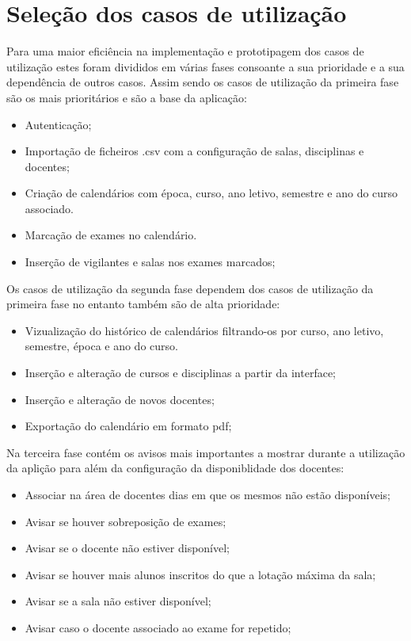 \documentclass[11pt, twoside]{report}
\begin{document}
	\section{Seleção dos casos de utilização}
	\label{selecaocasosdeuso}
	
	Para uma maior eficiência na implementação e prototipagem dos casos de utilização estes foram divididos em várias fases consoante a sua prioridade e a sua dependência de outros casos. Assim sendo os casos de utilização da primeira fase são os mais prioritários e são a base da aplicação:
	
	\begin{itemize}
		\item Autenticação;
		\item Importação de ficheiros .csv com a configuração de salas, disciplinas e docentes;
	 	\item Criação de calendários com época, curso, ano letivo, semestre e ano do curso associado.
	 	\item Marcação de exames no calendário.
	 	\item Inserção de vigilantes e salas nos exames marcados;
	\end{itemize}
	
	Os casos de utilização da segunda fase dependem dos casos de utilização da primeira fase no entanto também são de alta prioridade: 
	
	\begin{itemize}
		\item Vizualização do histórico de calendários filtrando-os por curso, ano letivo, semestre, época e ano do curso.
		\item Inserção e alteração de cursos e disciplinas a partir da interface;
		\item Inserção e alteração de novos docentes;
		\item Exportação do calendário em formato pdf;
	\end{itemize}


	Na terceira fase contém os avisos mais importantes a mostrar durante a utilização da aplição para além da configuração da disponiblidade dos docentes:
	
	\begin{itemize}
		\item Associar na área de docentes dias em que os mesmos não estão disponíveis;
		\item Avisar se houver sobreposição de exames;
		\item Avisar se o docente não estiver disponível;
		\item Avisar se houver mais alunos inscritos do que a lotação máxima da sala;
		\item Avisar se a sala não estiver disponível;
		\item Avisar caso o docente associado ao exame for repetido;
	\end{itemize}
	
\end{document}
